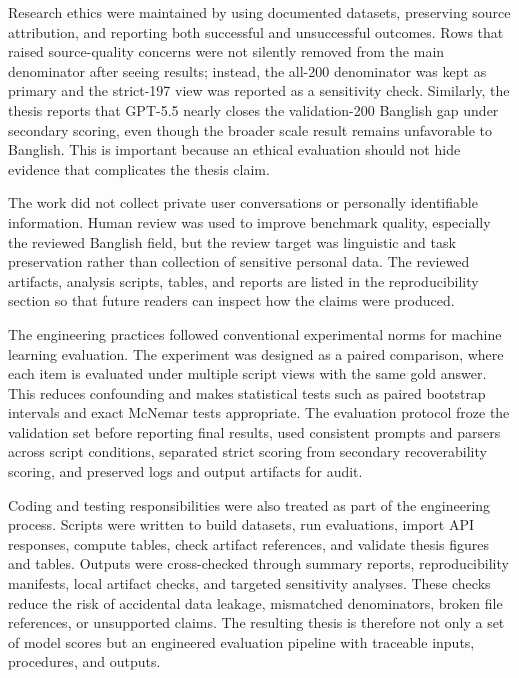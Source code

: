 Research ethics were maintained by using documented datasets, preserving source attribution, and reporting both successful and unsuccessful outcomes. Rows that raised source-quality concerns were not silently removed from the main denominator after seeing results; instead, the all-200 denominator was kept as primary and the strict-197 view was reported as a sensitivity check. Similarly, the thesis reports that GPT-5.5 nearly closes the validation-200 Banglish gap under secondary scoring, even though the broader scale result remains unfavorable to Banglish. This is important because an ethical evaluation should not hide evidence that complicates the thesis claim.

The work did not collect private user conversations or personally identifiable information. Human review was used to improve benchmark quality, especially the reviewed Banglish field, but the review target was linguistic and task preservation rather than collection of sensitive personal data. The reviewed artifacts, analysis scripts, tables, and reports are listed in the reproducibility section so that future readers can inspect how the claims were produced.

The engineering practices followed conventional experimental norms for machine learning evaluation. The experiment was designed as a paired comparison, where each item is evaluated under multiple script views with the same gold answer. This reduces confounding and makes statistical tests such as paired bootstrap intervals and exact McNemar tests appropriate. The evaluation protocol froze the validation set before reporting final results, used consistent prompts and parsers across script conditions, separated strict scoring from secondary recoverability scoring, and preserved logs and output artifacts for audit.

Coding and testing responsibilities were also treated as part of the engineering process. Scripts were written to build datasets, run evaluations, import API responses, compute tables, check artifact references, and validate thesis figures and tables. Outputs were cross-checked through summary reports, reproducibility manifests, local artifact checks, and targeted sensitivity analyses. These checks reduce the risk of accidental data leakage, mismatched denominators, broken file references, or unsupported claims. The resulting thesis is therefore not only a set of model scores but an engineered evaluation pipeline with traceable inputs, procedures, and outputs.


